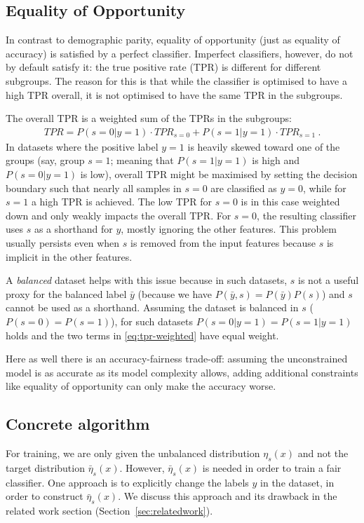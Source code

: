 \subsection{Equality of Opportunity}\label{ssec:eqopp}
In contrast to demographic parity,
equality of opportunity (just as equality of accuracy) is satisfied by a perfect classifier.
Imperfect classifiers, however, do not by default satisfy it:
the true positive rate (TPR) is different for different subgroups.
The reason for this is that while the classifier is optimised to have a high TPR overall,
it is not optimised to have the same TPR in the subgroups.

The overall TPR is a weighted sum of the TPRs in the subgroups:
\begin{align}
  \mathit{TPR}= P(s=0|y=1) \cdot \mathit{TPR}_{s=0} + P(s=1|y=1) \cdot \mathit{TPR}_{s=1}~.\label{eq:tpr-weighted}
\end{align}
In datasets where the positive label $y=1$ is heavily skewed toward one of the groups
(say, group $s=1$; meaning that $P(s=1|y=1)$ is high and $P(s=0|y=1)$ is low),
overall TPR might be maximised by setting the decision boundary
such that nearly all samples in $s=0$ are classified as $y=0$,
while for $s=1$ a high TPR is achieved.
The low TPR for $s=0$ is in this case weighted down and only weakly impacts the overall TPR\@.
For $s=0$, the resulting classifier uses $s$ as a shorthand for $y$, mostly ignoring the other features.
This problem usually persists even when $s$ is removed from the input features
because $s$ is implicit in the other features.

A \emph{balanced} dataset helps with this issue
because in such datasets, $s$ is not a useful proxy for the balanced label $\bar{y}$
(because we have $P(\bar{y}, s)=P(\bar{y})P(s)$) and $s$ cannot be used as a shorthand.
Assuming the dataset is balanced in $s$ ($P(s=0)=P(s=1)$),
for such datasets $P(s=0|y=1)=P(s=1|y=1)$ holds and the two terms in \eqref{eq:tpr-weighted} have equal weight.

Here as well there is an accuracy-fairness trade-off:
assuming the unconstrained model is as accurate as its model complexity allows,
adding additional constraints like equality of opportunity can only make the accuracy worse.

\subsection{Concrete algorithm}
For training, we are only given the unbalanced distribution $\eta_s(x)$
and not the target distribution $\bar{\eta}_s(x)$.
However, $\bar{\eta}_s(x)$ is needed in order to train a fair classifier.
One approach is to explicitly change the labels $y$ in the dataset, in order to construct $\bar{\eta}_s(x)$.
We discuss this approach and its drawback in the related work section (Section~\ref{sec:relatedwork}).

